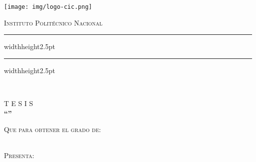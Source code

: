 \begin{titlepage}
\begin{adjustbox}{max width=1.2\linewidth, right}
\begin{minipage}[c][0.99\textheight][t]{0.13\textwidth}
            \centerline{\texttt{[image: img/logo-cic.png]}}
        \end{minipage}
        \begin{minipage}[c][0.99\textheight][t]{0.95\textwidth}
            \centering
            {\fontsize{24}{24}\selectfont\textsc{Instituto Politécnico Nacional\\}}
            \vspace{10pt}
            \begin{minipage}[t]{0.1\textwidth}
            \end{minipage}
            \hfill
            \begin{minipage}[t]{0.9\textwidth}
                {\color{pantone_222_c} \hrule width\textwidth height2.5pt}
            \end{minipage}
            \begin{minipage}[t]{0.9\textwidth}
                {\color{black_cic} \hrule width\textwidth height2.5pt}
            \end{minipage}
            \begin{minipage}[t]{0.1\textwidth}
            \end{minipage}
            
            \vspace{20pt}
            {\fontsize{16}{16}\selectfont\textsc{\schoolname\\}}

            \vspace{60pt}
            {\fontsize{25}{20}\selectfont T E S I S\\}
            \vspace{60pt}
            {\fontsize{16}{16}\selectfont\textbf{``\thesisname''\\}}

            \vspace{60pt}
            {\fontsize{14}{14}\selectfont\textsc{Que para obtener el grado de:\\}}
            \vspace{10pt}
            {\fontsize{14}{14}\selectfont\textbf{\academicdegree\\}}

            \vspace{60pt}
            {\fontsize{14}{14}\selectfont\textsc{Presenta:\\}}
            \vspace{10pt}
            {\fontsize{14}{14}\selectfont\textbf{\authorname\\}}


\end{minipage}
\end{adjustbox}
\end{titlepage}
